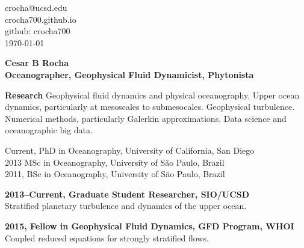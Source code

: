 \documentclass[a4paper,11pt,final]{memoir}
\newcommand{\Sep}{\vspace{1.5em}}
\newcommand{\SmallSep}{\vspace{0.5em}}
\newenvironment{Research}
    {\ignorespaces\textbf{\color{NavyBlue} Research}}
\newcommand{\CVSection}[1]
    {\Large\textbf{#1}\par
    \SmallSep\normalsize\normalfont}
\newcommand{\CVItem}[1]
    {\textbf{\color{NavyBlue} #1}}
\begin{document}
%

\begin{flushright}\small
    crocha@ucsd.edu\\[.1cm]
    crocha700.github.io\\[.1cm]
    github: crocha700\\[.1cm]
    \textcolor[gray]{0.45}{\mydate\today}\\[.1cm]
\end{flushright}\normalsize
\framebreak

\Huge\bfseries { \color{NavyBlue}  Cesar B Rocha} \\
\Large\bfseries Oceanographer, Geophysical Fluid Dynamicist, Phytonista \\

\normalsize\normalfont

\begin{Research}
Geophysical fluid dynamics and physical oceanography. Upper ocean dynamics, particularly
at mesoscales to submesocales. Geophysical turbulence.  Numerical methods, particularly Galerkin approximations.
Data science and oceanographic big data.
\end{Research}

\Sep


Current, PhD in Oceanography, University of California, San Diego \\
2013 MSc in Oceanography, University of S\~ao Paulo, Brazil \\
2011, BSc in Oceanography, University of S\~ao Paulo, Brazil \\

\Sep


\CVItem{2013--Current, Graduate Student Researcher, SIO/UCSD}\\
Stratified planetary turbulence and dynamics of the upper ocean.
\SmallSep

\CVItem{2015, Fellow in Geophysical Fluid Dynamics, GFD Program, WHOI}\\
Coupled reduced equations for strongly stratified flows.
\SmallSep
\end{document}
